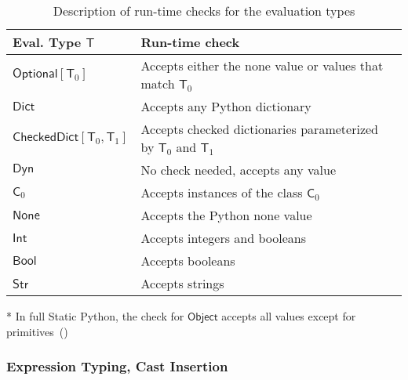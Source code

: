 \documentclass[english,cleveref,crc]{programming}
\newcommand{\SP}{Static Python}
\newcommand{\typefont}[1]{\mathsf{#1}}
\newcommand{\paramtype}[2]{#1[#2]}
\newcommand{\spteval}{\typefont{T}}
\newcommand{\sptclass}{\typefont{C}}
\newcommand{\sptint}{\typefont{Int}}
\newcommand{\sptstr}{\typefont{Str}}
\newcommand{\sptbool}{\typefont{Bool}}
\newcommand{\sptdyn}{\typefont{Dyn}}
\newcommand{\sptobject}{\typefont{Object}}
\newcommand{\sptnone}{\typefont{None}}
\newcommand{\sptoptional}[1]{\paramtype{\typefont{Optional}}{#1}}
\newcommand{\sptrawpydict}{\typefont{Dict}}
\newcommand{\sptrawchkdict}{\typefont{CheckedDict}} %
\newcommand{\sptchkdict}[2]{\paramtype{\sptrawchkdict}{#1, #2}}
\begin{document}
\begin{table}[t]
  \begin{threeparttable}
  \centering
  \caption{Description of run-time checks for the evaluation types}
  \label{t:cast}

    \begin{tabular}{l@{\quad}l}
    {Eval. Type $\spteval$} & {Run-time check} \\\hline
    $\sptoptional{\spteval_0}$ & {Accepts either the none value or values that match $\spteval_0$} \\
    $\sptrawpydict$ & {Accepts any Python dictionary} \\
    $\sptchkdict{\spteval_0}{\spteval_1}$ & {Accepts checked dictionaries parameterized by $\spteval_0$ and $\spteval_1$} \\
    $\sptdyn$ & {No check needed, accepts any value} \\
    $\sptclass_0$ & {Accepts instances of the class $\sptclass_0$\tnote{*}} \\
    $\sptnone$ & {Accepts the Python none value} \\
    $\sptint$ & {Accepts integers and booleans} \\
    $\sptbool$ & {Accepts booleans} \\
    $\sptstr$ & {Accepts strings}
    \end{tabular}

    \begin{tablenotes}
    \item {*} {\footnotesize In full \SP{}, the check for $\sptobject$ accepts all values except for primitives~()}
    \end{tablenotes}
\end{threeparttable}
\end{table}


\subsubsection{Expression Typing, Cast Insertion}
\end{document}
